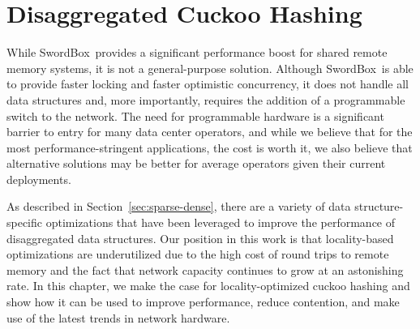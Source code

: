 \documentclass[12pt]{ucsddissertation}
\newcommand{\sword}{SwordBox}
\begin{document}

% 







\chapter{Disaggregated Cuckoo Hashing}
\label{chap:rcuckoo}


While \sword\ provides a significant performance boost for shared remote memory systems, it is not a
general-purpose solution. Although \sword\ is able to provide faster locking and faster optimistic
concurrency, it does not handle all data structures and, more importantly, requires the addition of
a programmable switch to the network. The need for programmable hardware is a significant barrier to
entry for many data center operators, and while we believe that for the most performance-stringent
applications, the cost is worth it, we also believe that alternative solutions may be better for
average operators given their current deployments.

As described in Section~\ref{sec:sparse-dense}, there are a variety of data structure-specific
optimizations that have been leveraged to improve the performance of disaggregated data structures.
Our position in this work is that locality-based optimizations are underutilized due to the high
cost of round trips to remote memory and the fact that network capacity continues to grow at an
astonishing rate. In this chapter, we make the case for locality-optimized cuckoo hashing and show
how it can be used to improve performance, reduce contention, and make use of the latest trends in
network hardware.




% 

%


%



\end{document}
